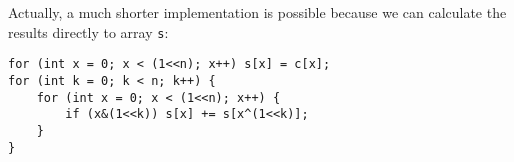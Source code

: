 Actually, a much shorter implementation is possible
because we can calculate the results directly
to array \texttt{s}:
\begin{lstlisting}
for (int x = 0; x < (1<<n); x++) s[x] = c[x];
for (int k = 0; k < n; k++) {
    for (int x = 0; x < (1<<n); x++) {
        if (x&(1<<k)) s[x] += s[x^(1<<k)];
    }
}
\end{lstlisting}

